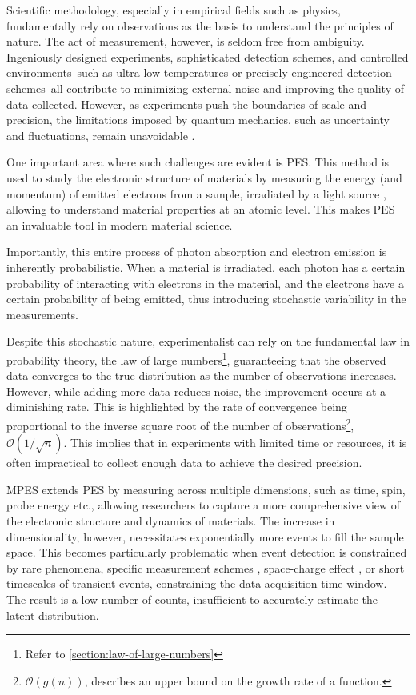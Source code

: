 Scientific methodology, especially in empirical fields such as physics, fundamentally rely on observations as the basis to understand the principles of nature. The act of measurement, however, is seldom free from ambiguity. Ingeniously designed experiments, sophisticated detection schemes, and controlled environments--such as ultra-low temperatures or precisely engineered detection schemes--all contribute to minimizing external noise and improving the quality of data collected. However, as experiments push the boundaries of scale and precision, the limitations imposed by quantum mechanics, such as uncertainty and fluctuations, remain unavoidable \cite{heisenbergPhysicalPrinciplesQuantum2009,sakuraiModernQuantumMechanics2020,binneyPhysicsQuantumMechanics2014}.

One important area where such challenges are evident is \gls{PES}. This method is used to study the electronic structure of materials by measuring the energy (and momentum) of emitted electrons from a sample, irradiated by a light source \cite{cardonaGeneralPrinciples1978}, allowing to understand material properties at an atomic level. This makes \gls{PES} an invaluable tool in modern material science. 

Importantly, this entire process of photon absorption and electron emission is inherently probabilistic. When a material is irradiated, each photon has a certain probability of interacting with electrons in the material, and the electrons have a certain probability of being emitted, thus introducing stochastic variability in the measurements.

Despite this stochastic nature, experimentalist can rely on the fundamental law in probability theory, the law of large numbers\footnote{Refer to \cref{section:law-of-large-numbers}}, guaranteeing that the observed data converges to the true distribution as the number of observations increases. However, while adding more data reduces \gls{noise}, the improvement occurs at a diminishing rate. This is highlighted by the rate of convergence being proportional to the inverse square root of the number of observations\footnote{$\mathcal{O}(g(n))$, describes an upper bound on the growth rate of a function.}, $\mathcal{O}(1/\sqrt{n})$. This implies that in experiments with limited time or resources, it is often impractical to collect enough data to achieve the desired precision.

\Gls{MPES} extends \gls{PES} by measuring across multiple dimensions, such as time, spin, probe energy etc., allowing researchers to capture a more comprehensive view of the electronic structure and dynamics of materials. The increase in dimensionality, however, necessitates exponentially more events to fill the sample space. This becomes particularly problematic when event detection is constrained by rare phenomena, specific measurement schemes \cite{maklarQuantitativeComparisonTimeflight2020}, space-charge effect \cite{schonhenseMultidimensionalPhotoemissionSpectroscopy2018}, or short timescales of transient events, constraining the data acquisition time-window. The result is a low number of counts, insufficient to accurately estimate the \gls{latent} distribution. 

